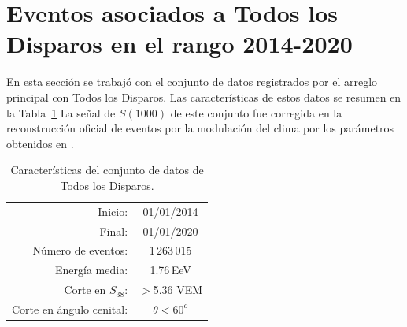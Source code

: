 
\section{Eventos asociados a Todos los Disparos en el rango 2014-2020 }	\label{ALL_modulacion}
	

En esta sección se trabajó con el conjunto de datos registrados por el arreglo principal con Todos los Disparos. Las características de estos datos se resumen en la Tabla~\ref{tabla:caracteristicas_ALL} La señal de $S(1000)$ de este conjunto fue corregida en la reconstrucción oficial de eventos por la modulación del clima por los parámetros obtenidos en \cite{aab2017impact}.

\begin{table}[H]
  \centering
  \begin{tabular}{r|c}
  Inicio:              & 01/01/2014\\ 
  Final:               & 01/01/2020       							\\ 
  Número de eventos:   & 1\,263\,015							\\ 
  Energía media:       & 1.76\,EeV       				\\  %
  Corte en $S_{38}$:   & $>$5.36 VEM        				\\ 
  Corte en ángulo cenital:		  & $\theta < 60^o$ 				\\ 
  \end{tabular}
\caption{Características del conjunto de datos de Todos los Disparos.} \label{tabla:caracteristicas_ALL}
\end{table}




